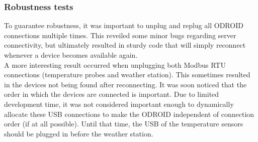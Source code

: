 \subsubsection{Robustness tests}\label{sec:robustness_tests}
To guarantee robustness, it was important to unplug and replug all ODROID connections multiple times. This reveiled some minor bugs regarding server connectivity, but ultimately resulted in sturdy code that will simply reconnect whenever a device becomes available again.\\

A more interesting result occurred when unplugging both Modbus RTU connections (temperature probes and weather station). This sometimes resulted in the devices not being found after reconnecting. It was soon noticed that the order in which the devices are connected is important. Due to limited development time, it was not considered important enough to dynamically allocate these USB connections to make the ODROID independent of connection order (if at all possible). Until that time, the USB of the temperature sensors should be plugged in before the weather station.